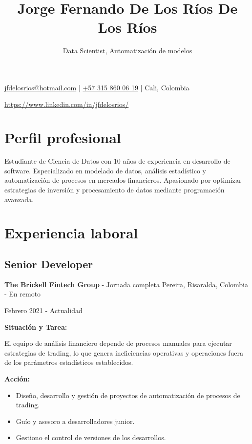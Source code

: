 \documentclass[letterpaper,12pt]{article}
\title{Jorge Fernando De Los Ríos De Los Ríos}
\author{Data Scientist, Automatización de modelos}
\date{}
\begin{document}
\justifying
\onehalfspacing

\maketitle

\href{mailto:jfdelosrios@hotmail.com}{jfdelosrios@hotmail.com} |
\href{tel:+573158600619}{+57 315 860 06 19} |
Cali, Colombia

\href{https://www.linkedin.com/in/jfdelosrios/}{https://www.linkedin.com/in/jfdelosrios/}

\section*{Perfil profesional}

Estudiante de Ciencia de Datos con 10 años de experiencia en desarrollo de software. Especializado en modelado de datos, análisis estadístico y automatización de procesos en mercados financieros. Apasionado por optimizar estrategias de inversión y procesamiento de datos mediante programación avanzada.

\section*{Experiencia laboral}

\subsection*{Senior Developer}

\textbf{The Brickell Fintech Group} - Jornada completa Pereira, Risaralda, Colombia - En remoto

Febrero 2021 - Actualidad

\textbf{Situación y Tarea:}

El equipo de análisis financiero depende de procesos manuales para ejecutar estrategias de trading, lo que genera ineficiencias operativas y operaciones fuera de los parámetros estadísticos establecidos.

\textbf{Acción:}

\begin{itemize}
    \item Diseño, desarrollo y gestión de proyectos de automatización de procesos de trading.
    \item Guío y asesoro a desarrolladores junior.
    \item Gestiono el control de versiones de los desarrollos.
\end{itemize}
\end{document}
